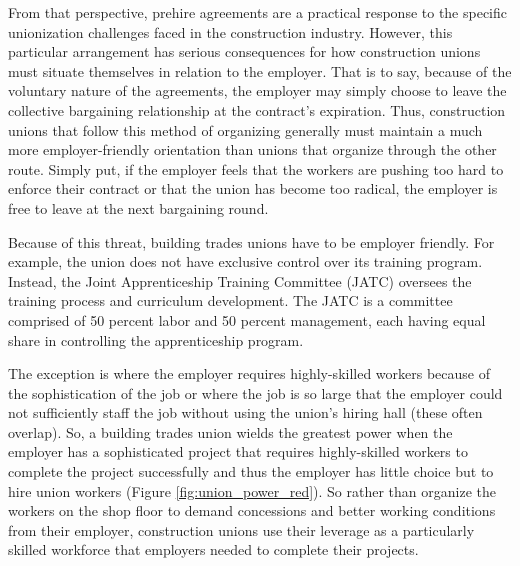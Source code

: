 \documentclass[12pt]{article}
\begin{document}
From that perspective, prehire agreements are a practical response to the specific unionization challenges faced in the construction industry. However, this particular arrangement has serious consequences for how construction unions must situate themselves in relation to the employer. That is to say, because of the voluntary nature of the agreements, the employer may simply choose to leave the collective bargaining relationship at the contract's expiration. Thus, construction unions that follow this method of organizing generally must maintain a much more employer-friendly orientation than unions that organize through the other route. Simply put, if the employer feels that the workers are pushing too hard to enforce their contract or that the union has become too radical, the employer is free to leave at the next bargaining round.

Because of this threat, building trades unions have to be employer friendly. For example, the union does not have exclusive control over its training program. Instead, the Joint Apprenticeship Training Committee (JATC) oversees the training process and curriculum development. The JATC is a committee comprised of 50 percent labor and 50 percent management, each having equal share in controlling the apprenticeship program. 

The exception is where the employer requires highly-skilled workers because of the sophistication of the job or where the job is so large that the employer could not sufficiently staff the job without using the union's hiring hall (these often overlap). So, a building trades union wields the greatest power when the employer has a sophisticated project that requires highly-skilled workers to complete the project successfully and thus the employer has little choice but to hire union workers (Figure \ref{fig:union_power_red}). So rather than organize the workers on the shop floor to demand concessions and better working conditions from their employer, construction unions use their leverage as a particularly skilled workforce that employers needed to complete their projects.
\end{document}
